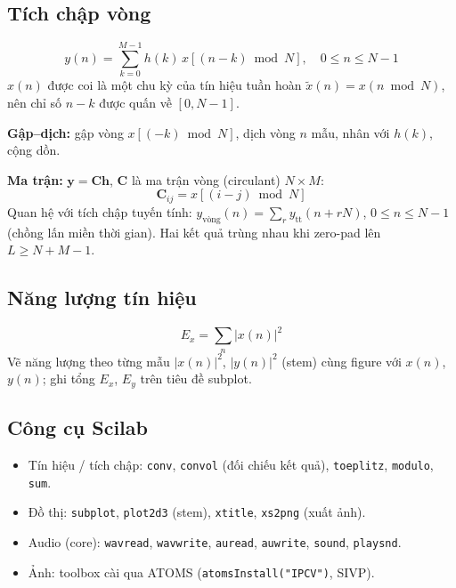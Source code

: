 \subsection{Tích chập vòng}
\[
y(n) = \sum_{k=0}^{M-1} h(k)\,x[(n-k) \bmod N], \quad 0 \le n \le N-1
\]
$x(n)$ được coi là một chu kỳ của tín hiệu tuần hoàn $\tilde{x}(n) = x(n \bmod N)$, nên chỉ số $n-k$ được quấn về $[0, N-1]$.

\noindent\textbf{Gập--dịch:} gập vòng $x[(-k) \bmod N]$, dịch vòng $n$ mẫu, nhân với $h(k)$, cộng dồn.

\noindent\textbf{Ma trận:} $\mathbf{y} = \mathbf{C}\mathbf{h}$, $\mathbf{C}$ là ma trận vòng (circulant) $N \times M$:
\[
\mathbf{C}_{ij} = x[(i-j) \bmod N]
\]
Quan hệ với tích chập tuyến tính: $y_{\text{vòng}}(n) = \sum_{r} y_{\text{tt}}(n + rN)$, $0 \le n \le N-1$ (chồng lấn miền thời gian). Hai kết quả trùng nhau khi zero-pad lên $L \ge N+M-1$.

\subsection{Năng lượng tín hiệu}
\[
E_x = \sum_{n} |x(n)|^2
\]
Vẽ năng lượng theo từng mẫu $|x(n)|^2$, $|y(n)|^2$ (stem) cùng figure với $x(n)$, $y(n)$; ghi tổng $E_x$, $E_y$ trên tiêu đề subplot.

\subsection{Công cụ Scilab}
\begin{itemize}
    \item Tín hiệu / tích chập: \texttt{conv}, \texttt{convol} (đối chiếu kết quả), \texttt{toeplitz}, \texttt{modulo}, \texttt{sum}.
    \item Đồ thị: \texttt{subplot}, \texttt{plot2d3} (stem), \texttt{xtitle}, \texttt{xs2png} (xuất ảnh).
    \item Audio (core): \texttt{wavread}, \texttt{wavwrite}, \texttt{auread}, \texttt{auwrite}, \texttt{sound}, \texttt{playsnd}.
    \item Ảnh: toolbox cài qua ATOMS (\texttt{atomsInstall("IPCV")}, SIVP).
\end{itemize}
